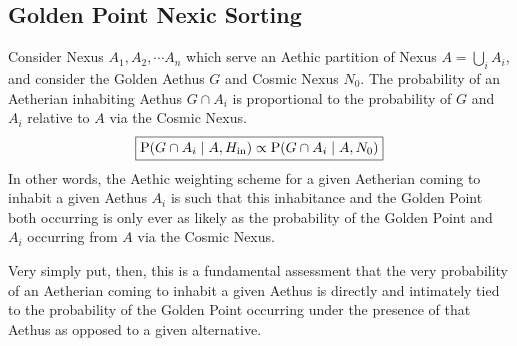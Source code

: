 \subsection{Golden Point Nexic Sorting}

\begin{prince}
    Consider Nexus $A_1, A_2, \cdots A_n$ which serve an Aethic partition of Nexus $A = \bigcup_i A_i$, and consider the Golden Aethus $G$ and Cosmic Nexus $N_0$. The probability of an Aetherian inhabiting Aethus $G \cap A_i$ is proportional to the probability of $G$ and $A_i$ relative to $A$ via the Cosmic Nexus. 
    \begin{equation}
        \boxed{
        \operatorname{P} \! \left( G \cap A_i \;\middle|\; A, H_{\textnormal{in}} \right) \propto \operatorname{P} \! \left( G \cap A_i \;\middle|\; A, N_0 \right)
        }
    \end{equation}
    In other words, the Aethic weighting scheme for a given Aetherian coming to inhabit a given Aethus $A_i$ is such that this inhabitance and the Golden Point both occurring is only ever as likely as the probability of the Golden Point and $A_i$ occurring from $A$ via the Cosmic Nexus. 

    Very simply put, then, this is a fundamental assessment that the very probability of an Aetherian coming to inhabit a given Aethus is directly and intimately tied to the probability of the Golden Point occurring under the presence of that Aethus as opposed to a given alternative. 
\end{prince}

